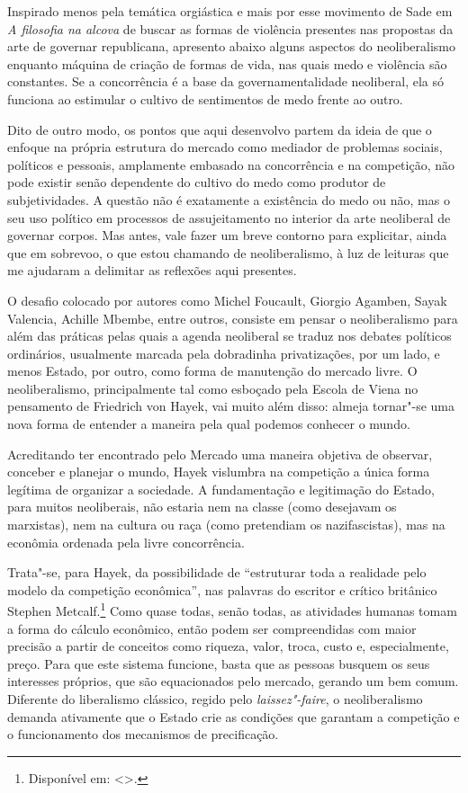 \asterisc

Inspirado menos pela temática orgiástica e mais por esse movimento de
Sade em \emph{A filosofia na alcova} de buscar as formas de violência
presentes nas propostas da arte de governar republicana, apresento
abaixo alguns aspectos do neoliberalismo enquanto máquina de criação de
formas de vida, nas quais medo e violência são constantes. Se a
concorrência é a base da governamentalidade neoliberal, ela só funciona
ao estimular o cultivo de sentimentos de medo frente ao outro.

Dito de outro modo, os pontos que aqui desenvolvo partem da ideia de
que o enfoque na própria estrutura do mercado como mediador de problemas
sociais, políticos e pessoais, amplamente embasado na concorrência e na
competição, não pode existir senão dependente do cultivo do medo como
produtor de subjetividades. A questão não é exatamente a existência do
medo ou não, mas o seu uso político em processos de assujeitamento no
interior da arte neoliberal de governar corpos. Mas antes, vale fazer um
breve contorno para explicitar, ainda que em sobrevoo, o que estou
chamando de neoliberalismo, à luz de leituras que me ajudaram a
delimitar as reflexões aqui presentes.

\asterisc

O desafio colocado por autores como Michel Foucault, Giorgio Agamben,
Sayak Valencia, Achille Mbembe, entre outros, consiste em pensar o
neoliberalismo para além das práticas pelas quais a agenda neoliberal se
traduz nos debates políticos ordinários, usualmente marcada pela
dobradinha privatizações, por um lado, e menos Estado, por outro, como
forma de manutenção do mercado livre. O neoliberalismo, principalmente
tal como esboçado pela Escola de Viena no pensamento de Friedrich von
Hayek, vai muito além disso: almeja tornar"-se uma nova forma de entender
a maneira pela qual podemos conhecer o mundo.

Acreditando ter encontrado pelo Mercado uma maneira objetiva de
observar, conceber e planejar o mundo, Hayek vislumbra na competição a
única forma legítima de organizar a sociedade. A fundamentação e
legitimação do Estado, para muitos neoliberais, não estaria nem na
classe (como desejavam os marxistas), nem na cultura ou raça (como
pretendiam os nazifascistas), mas na econômia ordenada pela livre
concorrência.

Trata"-se, para Hayek, da possibilidade de ``estruturar toda a realidade
pelo modelo da competição econômica'', nas palavras do escritor e
crítico britânico Stephen Metcalf.\footnote{Disponível em: \textless{}{}\textgreater{}.}
Como quase todas, senão todas, as atividades humanas tomam a forma do
cálculo econômico, então podem ser compreendidas com maior precisão a
partir de conceitos como riqueza, valor, troca, custo e, especialmente,
preço. Para que este sistema funcione, basta que as pessoas busquem os
seus interesses próprios, que são equacionados pelo mercado, gerando um
bem comum. Diferente do liberalismo clássico, regido pelo \emph{laissez"-faire},
o neoliberalismo demanda ativamente que o Estado crie as condições que
garantam a competição e o funcionamento dos mecanismos de precificação.

